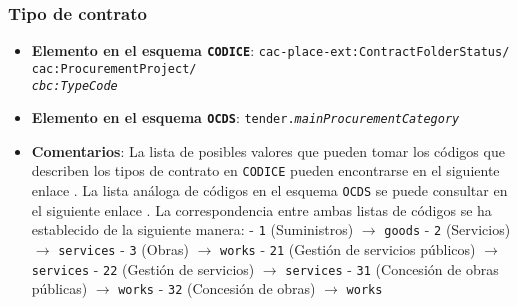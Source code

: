         \subsubsection{Tipo de contrato}
            \begin{itemize}
                \item \textbf{Elemento en el esquema \texttt{CODICE}}:
                    \tabto{7.6cm} \texttt{cac-place-ext:ContractFolderStatus/} \\
                    \tabto{7.6cm} \texttt{cac:ProcurementProject/} \\
                    \tabto{7.6cm} \texttt{\textit{cbc:TypeCode}}
                \item \textbf{Elemento en el esquema \texttt{OCDS}}:
                    \tabto{7.6cm} \texttt{tender.\textit{mainProcurementCategory}}
                \item \textbf{Comentarios}: La lista de posibles valores que pueden tomar los códigos que describen los tipos de contrato en \texttt{CODICE} pueden encontrarse en el siguiente enlace \cite{CR3}. La lista análoga de códigos en el esquema \texttt{OCDS} se puede consultar en el siguiente enlace \cite{CR4}. La correspondencia entre ambas listas de códigos se ha establecido de la siguiente manera:
                        \subitem - \texttt{1} (Suministros) $\rightarrow$ \texttt{goods}
                        \subitem - \texttt{2} (Servicios) $\rightarrow$ \texttt{services}
                        \subitem - \texttt{3} (Obras) $\rightarrow$ \texttt{works}
                        \subitem - \texttt{21} (Gestión de servicios públicos) $\rightarrow$ \texttt{services}
                        \subitem - \texttt{22} (Gestión de servicios) $\rightarrow$ \texttt{services}
                        \subitem - \texttt{31} (Concesión de obras públicas) $\rightarrow$ \texttt{works}
                        \subitem - \texttt{32} (Concesión de obras) $\rightarrow$ \texttt{works}
            \end{itemize}
        

